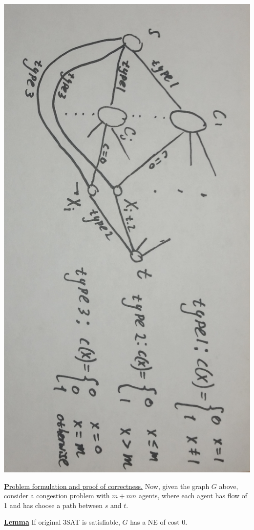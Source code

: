\includegraphics[scale=0.1]{1.jpg}

\uline{\textbf Problem formulation and proof of correctness.} Now, given the graph $G$ above, consider a congestion problem with $m + mn$ agents, where each agent has flow of 1 and has choose a path between $s$ and $t$. 
\bigskip

\uline{\textbf{Lemma}} If original 3SAT is satisfiable, $G$ has a NE of cost 0.

